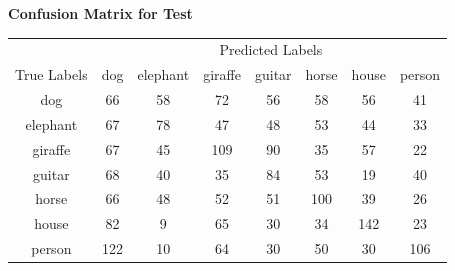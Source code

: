 \documentclass{article}
\begin{document}
    
\begin{center}
    \textbf{Confusion Matrix for Test}
    
    \begin{tabular}{c|ccccccc}
    \toprule
    & \multicolumn{7}{c}{Predicted Labels} \\
    \cmidrule(lr){2-8}
    True Labels & dog & elephant & giraffe & guitar & horse & house & person \\
    \midrule
    dog & 66 & 58 & 72 & 56 & 58 & 56 & 41 \\
    elephant & 67 & 78 & 47 & 48 & 53 & 44 & 33 \\
    giraffe & 67 & 45 & 109 & 90 & 35 & 57 & 22 \\
    guitar & 68 & 40 & 35 & 84 & 53 & 19 & 40 \\
    horse & 66 & 48 & 52 & 51 & 100 & 39 & 26 \\
    house & 82 & 9 & 65 & 30 & 34 & 142 & 23 \\
    person & 122 & 10 & 64 & 30 & 50 & 30 & 106 \\
    \bottomrule
    \end{tabular}
    \label{tab:confusion_matrix_test}
    \end{center}
        
\end{document}
